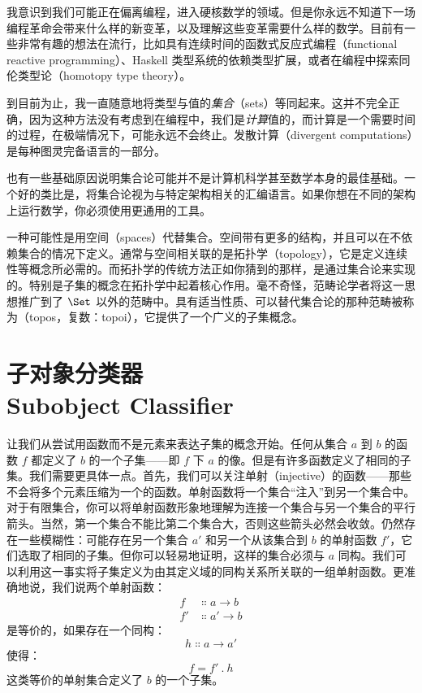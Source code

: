 
\lettrine[lhang=0.17]{我}{意识到我们可能正在}偏离编程，进入硬核数学的领域。但是你永远不知道下一场编程革命会带来什么样的新变革，以及理解这些变革需要什么样的数学。目前有一些非常有趣的想法在流行，比如具有连续时间的函数式反应式编程（functional reactive programming）、Haskell 类型系统的依赖类型扩展，或者在编程中探索同伦类型论（homotopy type theory）。

到目前为止，我一直随意地将类型与值的\emph{集合}（sets）等同起来。这并不完全正确，因为这种方法没有考虑到在编程中，我们是\emph{计算}值的，而计算是一个需要时间的过程，在极端情况下，可能永远不会终止。发散计算（divergent computations）是每种图灵完备语言的一部分。

也有一些基础原因说明集合论可能并不是计算机科学甚至数学本身的最佳基础。一个好的类比是，将集合论视为与特定架构相关的汇编语言。如果你想在不同的架构上运行数学，你必须使用更通用的工具。

一种可能性是用空间（spaces）代替集合。空间带有更多的结构，并且可以在不依赖集合的情况下定义。通常与空间相关联的是拓扑学（topology），它是定义连续性等概念所必需的。而拓扑学的传统方法正如你猜到的那样，是通过集合论来实现的。特别是子集的概念在拓扑学中起着核心作用。毫不奇怪，范畴论学者将这一思想推广到了 $\Set$ 以外的范畴中。具有适当性质、可以替代集合论的那种范畴被称为（topos，复数：topoi），它提供了一个广义的子集概念。

\section{子对象分类器\\ \textmd{Subobject Classifier}}

让我们从尝试用函数而不是元素来表达子集的概念开始。任何从集合 $a$ 到 $b$ 的函数 $f$ 都定义了 $b$ 的一个子集——即 $f$ 下 $a$ 的像。但是有许多函数定义了相同的子集。我们需要更具体一点。首先，我们可以关注单射（injective）的函数——那些不会将多个元素压缩为一个的函数。单射函数将一个集合``注入''到另一个集合中。对于有限集合，你可以将单射函数形象地理解为连接一个集合与另一个集合的平行箭头。当然，第一个集合不能比第二个集合大，否则这些箭头必然会收敛。仍然存在一些模糊性：可能存在另一个集合 $a'$ 和另一个从该集合到 $b$ 的单射函数 $f'$，它们选取了相同的子集。但你可以轻易地证明，这样的集合必须与 $a$ 同构。我们可以利用这一事实将子集定义为由其定义域的同构关系所关联的一组单射函数。更准确地说，我们说两个单射函数：
\begin{align*}
  f  & \Colon a \to b  \\
  f' & \Colon a' \to b
\end{align*}
是等价的，如果存在一个同构：
\[h \Colon a \to a'\]
使得：
\[f = f'\ .\ h\]
这类等价的单射集合定义了 $b$ 的一个子集。

